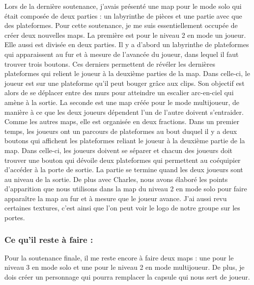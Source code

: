 \documentclass{article}
\begin{document}
\quad 

\quad

Lors de la dernière soutenance, j’avais présenté une map pour le mode solo qui était composée de deux parties : un labyrinthe de pièces et une partie avec que des plateformes. Pour cette soutenance, je me suis essentiellement occupée de créer deux nouvelles maps. La première est pour le niveau 2 en mode un joueur. Elle aussi est divisée en deux parties. Il y a d’abord un labyrinthe de plateformes qui apparaissent au fur et à mesure de l’avancée du joueur, dans lequel il faut trouver trois boutons. Ces derniers permettent de révéler les dernières plateformes qui relient le joueur à la deuxième parties de la map. Dans celle-ci, le joueur est sur une plateforme qu’il peut bouger grâce aux clips. Son objectif est alors de se déplacer entre des murs pour atteindre un escalier arc-en-ciel qui amène à la sortie. La seconde est une map créée pour le mode multijoueur, de manière à ce que les deux joueurs dépendent l’un de l’autre doivent s’entraider. Comme les autres maps, elle est organisée en deux fractions. Dans un premier temps, les joueurs ont un parcours de plateformes au bout duquel il y a deux boutons qui affichent les plateformes reliant le joueur à la deuxième partie de la map. Dans celle-ci, les joueurs doivent se séparer et chacun des joueurs doit trouver une bouton qui dévoile deux plateformes qui permettent au coéquipier d’accéder à la porte de sortie. La partie se termine quand les deux joueurs sont au niveau de la sortie. De plus avec Charles, nous avons élaboré les points d’apparition que nous utilisons dans la map du niveau 2 en mode solo pour faire apparaître la map au fur et à mesure que le joueur avance. J’ai aussi revu certaines textures, c’est ainsi que l’on peut voir le logo de notre groupe sur les portes.


\quad

\quad

		\subsubsection{Ce qu'il reste à faire :}

\quad

\quad

Pour la soutenance finale, il me reste encore à faire deux maps : une pour le niveau 3 en mode solo et une pour le niveau 2 en mode multijoueur. De plus, je dois créer un personnage qui pourra remplacer la capsule qui nous sert de joueur.
\end{document}
